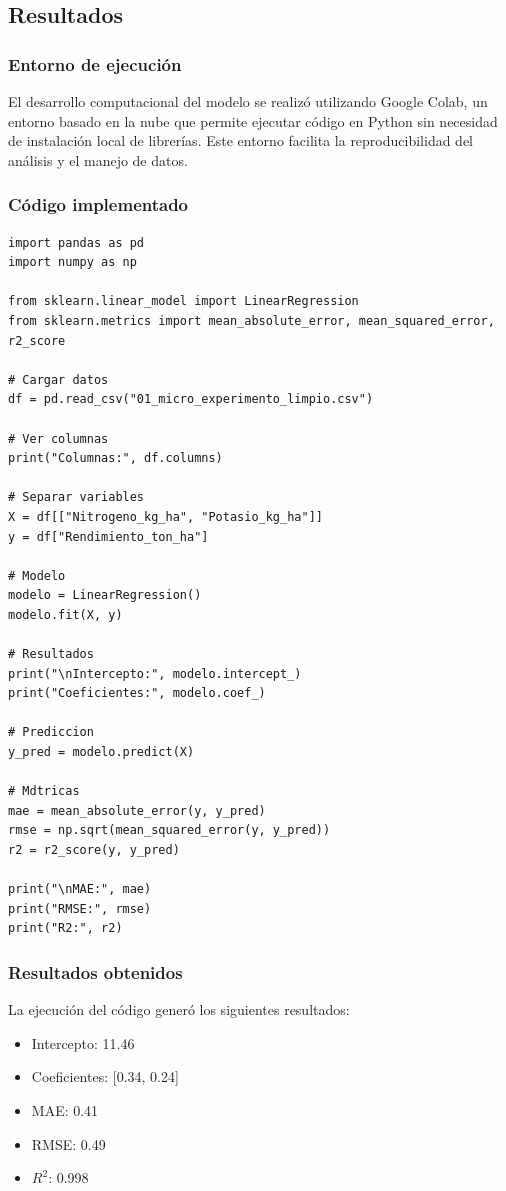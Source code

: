 \subsection{Resultados}
\subsubsection{Entorno de ejecución}

El desarrollo computacional del modelo se realizó utilizando Google Colab, un entorno basado en la nube que permite ejecutar código en Python sin necesidad de instalación local de librerías. Este entorno facilita la reproducibilidad del análisis y el manejo de datos.


\subsubsection{Código implementado}

\begin{lstlisting}
import pandas as pd
import numpy as np

from sklearn.linear_model import LinearRegression
from sklearn.metrics import mean_absolute_error, mean_squared_error, r2_score

# Cargar datos
df = pd.read_csv("01_micro_experimento_limpio.csv")

# Ver columnas
print("Columnas:", df.columns)

# Separar variables
X = df[["Nitrogeno_kg_ha", "Potasio_kg_ha"]]
y = df["Rendimiento_ton_ha"]

# Modelo
modelo = LinearRegression()
modelo.fit(X, y)

# Resultados
print("\nIntercepto:", modelo.intercept_)
print("Coeficientes:", modelo.coef_)

# Prediccion
y_pred = modelo.predict(X)

# Mdtricas
mae = mean_absolute_error(y, y_pred)
rmse = np.sqrt(mean_squared_error(y, y_pred))
r2 = r2_score(y, y_pred)

print("\nMAE:", mae)
print("RMSE:", rmse)
print("R2:", r2)
\end{lstlisting}

\subsubsection{Resultados obtenidos}

La ejecución del código generó los siguientes resultados:

\begin{itemize}
    \item Intercepto: 11.46
    \item Coeficientes: [0.34, 0.24]
    \item MAE: 0.41
    \item RMSE: 0.49
    \item $R^2$: 0.998
\end{itemize}

